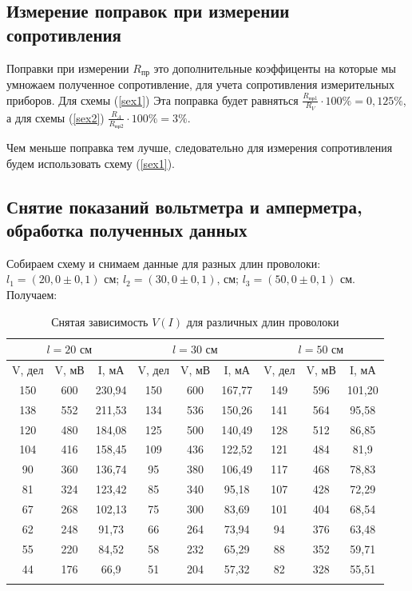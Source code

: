 \documentclass[a4paper, 12pt]{article}
\begin{document}
	\subsection{Измерение поправок при измерении сопротивления}
	
	Поправки при измерении $R_\text{пр}$ это дополнительные коэффиценты на которые мы умножаем полученное сопротивление, для учета сопротивления измерительных приборов. Для схемы (\ref{sex1}) Эта поправка будет равняться $\frac{R_\text{пр1}}{R_V}\cdot 100\% = 0,125\%$, а для схемы (\ref{sex2}) $\frac{R_A}{R_\text{пр2}} \cdot 100\% = 3\%$.
	
	Чем меньше поправка тем лучше, следовательно для измерения сопротивления будем использовать схему (\ref{sex1}).
	
	\subsection{Снятие показаний вольтметра и амперметра, обработка полученных данных}
	
	Собираем схему и снимаем данные для разных длин проволоки: $l_1=(20,0 \pm 0,1)\text{ см}$; $l_2=(30,0 \pm 0,1) \text{, см}$; $ l_3=(50,0 \pm 0,1)\text{ см}$. Получаем:
	\begin{longtable}[H]{|c|c|c||c|c|c||c|c|c|}
		\hline
		\multicolumn{3}{|c||}{$l = 20 \text{ см}$} & \multicolumn{3}{c||}{$l = 30 \text{ см}$} & \multicolumn{3}{c|}{$l = 50 \text{ см}$}  \\
		\hline
		V, дел & V, мВ & I, мА & V, дел & V, мВ & I, мА & V, дел & V, мВ & I, мА \\
		\hline
		150 & 600 & 230,94 & 150 & 600 & 167,77 & 149 & 596 & 101,20 \\
		\hline
		138 & 552 & 211,53 & 134 & 536 & 150,26 & 141 & 564 & 95,58 \\
		\hline
		120 & 480 & 184,08 & 125 & 500 & 140,49 & 128 & 512 & 86,85 \\
		\hline
		104 & 416 & 158,45 & 109 & 436 & 122,52 & 121 & 484 & 81,9 \\
		\hline
		90 & 360 & 136,74 & 95 & 380 & 106,49 & 117 & 468 & 78,83 \\
		\hline
		81 & 324 & 123,42 & 85 & 340 & 95,18 & 107 & 428 & 72,29 \\
		\hline
		67 & 268 & 102,13 & 75 & 300 & 83,69 & 101 & 404 & 68,54 \\
		\hline
		62 & 248 & 91,73 & 66 & 264 & 73,94 & 94 & 376 & 63,48 \\
		\hline
		55 & 220 & 84,52 & 58 & 232 & 65,29 & 88 & 352 & 59,71 \\
		\hline
		44 & 176 & 66,9 & 51 & 204 & 57,32 & 82 & 328 & 55,51 \\
		\hline
		\caption{Снятая зависимость $V(I)$ для различных длин проволоки}
	\end{longtable}
\end{document}
